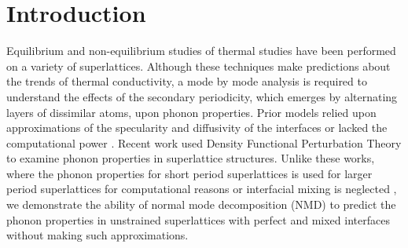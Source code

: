 \documentclass[aps,prb,preprint,preprintnumbers,amsmath,amssymb,floatfix,superscriptaddress]{revtex4}
\begin{document}
\section{Introduction}
Equilibrium \cite {PhysRevB.85.195302} and non-equilibrium \cite {PhysRevB.79.214307,PhysRevB.79.075316,PhysRevB.72.174302} studies of thermal studies have been performed on a variety of superlattices. Although these techniques make predictions about the trends of thermal conductivity, a mode by mode analysis is required to understand the effects of the secondary periodicity, which emerges by alternating layers of dissimilar atoms, upon phonon properties. Prior models relied upon approximations of the specularity and diffusivity of the interfaces \cite {PhysRevB.57.14958} or lacked the computational power \cite {PhysRevB.70.081310}. Recent work \cite{Luckyanova16112012,doi:10.1021/nl202186y} used Density Functional Perturbation Theory to examine phonon properties in superlattice structures. Unlike these works, where the phonon properties for short period superlattices is used for larger period superlattices for computational reasons \cite{Luckyanova16112012, doi:10.1021/nl202186y} or interfacial mixing is neglected \cite{doi:10.1021/nl202186y}, we demonstrate the ability of normal mode decomposition (NMD) to predict the phonon properties in unstrained superlattices with perfect and mixed interfaces without making such approximations.
\end{document}

